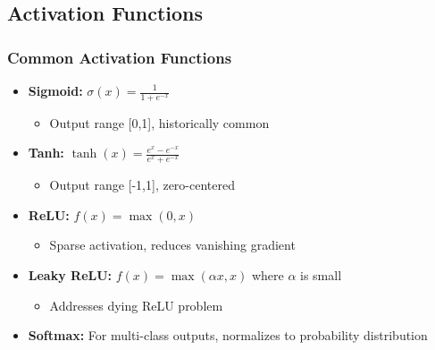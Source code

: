 \documentclass[5pt,aspectratio=169]{beamer}
\begin{document}
\subsection{Activation Functions}
\begin{frame}
\frametitle{Common Activation Functions}
\begin{itemize}
    \item \textbf{Sigmoid:} $\sigma(x) = \frac{1}{1+e^{-x}}$
    \begin{itemize}
        \item Output range [0,1], historically common
    \end{itemize}
    \item \textbf{Tanh:} $\tanh(x) = \frac{e^x - e^{-x}}{e^x + e^{-x}}$
    \begin{itemize}
        \item Output range [-1,1], zero-centered
    \end{itemize}
    \item \textbf{ReLU:} $f(x) = \max(0,x)$
    \begin{itemize}
        \item Sparse activation, reduces vanishing gradient
    \end{itemize}
    \item \textbf{Leaky ReLU:} $f(x) = \max(\alpha x,x)$ where $\alpha$ is small
    \begin{itemize}
        \item Addresses dying ReLU problem
    \end{itemize}
    \item \textbf{Softmax:} For multi-class outputs, normalizes to probability distribution
\end{itemize}
\end{frame}
\end{document}
